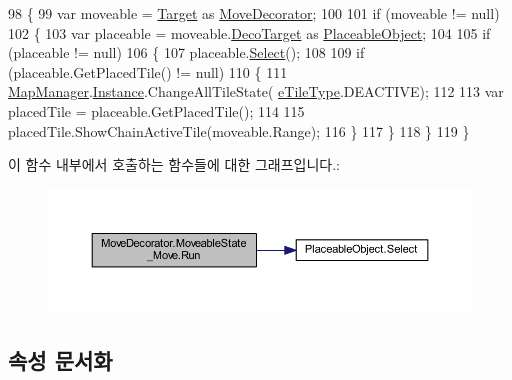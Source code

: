 \begin{DoxyCode}
98         \{
99             var moveable = \hyperlink{class_m_c_n_1_1_state_a79a563b32f183c9adc9a96679fc57eb8}{Target} as \hyperlink{class_move_decorator}{MoveDecorator};
100 
101             \textcolor{keywordflow}{if} (moveable != null)
102             \{
103                 var placeable = moveable.\hyperlink{class_m_c_n_1_1_decorator_a1306a0a8b814650cd5970a1ffc7ba2fe}{DecoTarget} as \hyperlink{class_placeable_object}{PlaceableObject};
104 
105                 \textcolor{keywordflow}{if} (placeable != null)
106                 \{
107                     placeable.\hyperlink{class_placeable_object_a019818f3f6c6eb715fed163efa921f5a}{Select}();
108 
109                     \textcolor{keywordflow}{if} (placeable.GetPlacedTile() != null)
110                     \{
111                         \hyperlink{class_map_manager}{MapManager}.\hyperlink{class_m_c_n_1_1_mono_singletone_aa50c027cca64cf4ad30c1ee5c83e0b78}{Instance}.ChangeAllTileState(
      \hyperlink{_tile_8cs_a271bc07be325bca511bcb747e0ff2fda}{eTileType}.DEACTIVE);
112 
113                         var placedTile = placeable.GetPlacedTile();
114 
115                         placedTile.ShowChainActiveTile(moveable.Range);
116                     \}
117                 \}
118             \}
119         \}
\end{DoxyCode}


이 함수 내부에서 호출하는 함수들에 대한 그래프입니다.\+:\nopagebreak
\begin{figure}[H]
\begin{center}
\leavevmode
\includegraphics[width=350pt]{class_move_decorator_1_1_moveable_state___move_ae1bb2c9ca5992373aa872788775d3e4a_cgraph}
\end{center}
\end{figure}




\subsection{속성 문서화}
